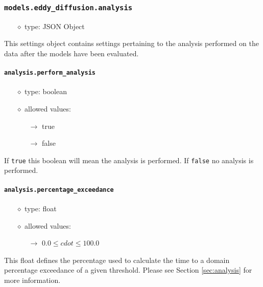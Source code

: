 \documentclass[]{article}
\def\code#1{\texttt{#1}}
\begin{document}
\subsubsection{\code{models.eddy\_diffusion.analysis}}
\begin{itemize}
    \item[$\diamond$] type: JSON Object 
\end{itemize}
This settings object contains settings pertaining to the analysis performed on
the data after the models have been evaluated.

\paragraph{\code{analysis.perform\_analysis}}\label{sec:percex}
\begin{itemize}
    \item[$\diamond$] type: boolean
    \item[$\diamond$] allowed values:
    \begin{itemize}
        \item[$\rightarrow$] true
        \item[$\rightarrow$] false
    \end{itemize}
\end{itemize}
If \code{true} this boolean will mean the analysis is performed. If \code{false}
no analysis is performed.

\paragraph{\code{analysis.percentage\_exceedance}}\label{sec:percex}
\begin{itemize}
    \item[$\diamond$] type: float
    \item[$\diamond$] allowed values:
    \begin{itemize}
        \item[$\rightarrow$] $0.0\leq cdot\leq 100.0$
    \end{itemize}
\end{itemize}
This float defines the percentage used to calculate the time to a domain
percentage exceedance of a given threshold. Please see Section
\ref{sec:analysis} for more information.
\end{document}
